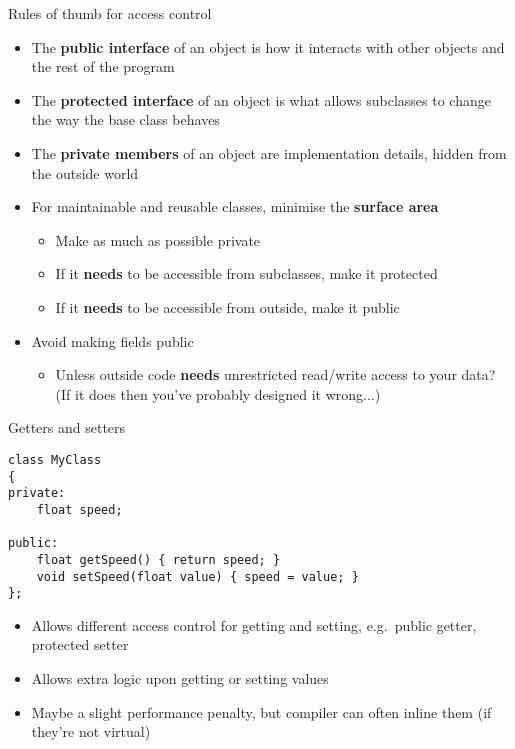 \begin{frame}{Rules of thumb for access control}
	\begin{itemize}
		\pause\item The \textbf{public interface} of an object is how it interacts with other objects and the rest of the program
		\pause\item The \textbf{protected interface} of an object is what allows subclasses to change the way the base class behaves
		\pause\item The \textbf{private members} of an object are implementation details, hidden from the outside world
		\pause\item For maintainable and reusable classes, minimise the \textbf{surface area}
			\begin{itemize}
				\pause\item Make as much as possible private
				\pause\item If it \textbf{needs} to be accessible from subclasses, make it protected
				\pause\item If it \textbf{needs} to be accessible from outside, make it public
			\end{itemize}
		\pause\item Avoid making fields public
			\begin{itemize}
				\pause\item Unless outside code \textbf{needs} unrestricted read/write access to your data?
					(If it does then you've probably designed it wrong...)
			\end{itemize}
	\end{itemize}
\end{frame}

\begin{frame}[fragile]{Getters and setters}
	\begin{lstlisting}
class MyClass
{
private:
	float speed;

public:
	float getSpeed() { return speed; }
	void setSpeed(float value) { speed = value; }
};
	\end{lstlisting}
	\begin{itemize}
		\pause\item Allows different access control for getting and setting,
			e.g.\ public getter, protected setter
		\pause\item Allows extra logic upon getting or setting values
		\pause\item Maybe a slight performance penalty,
			but compiler can often inline them (if they're not virtual)
	\end{itemize}
\end{frame}
